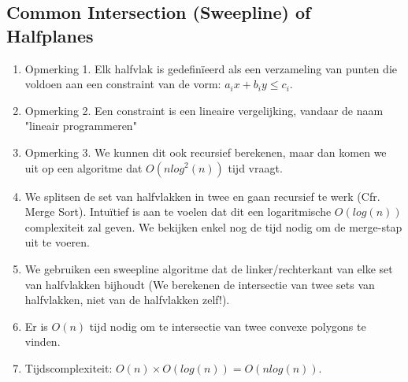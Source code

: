 \documentclass[12pt,a4paper]{article}
\begin{document}
		\subsection{Common Intersection (Sweepline) of Halfplanes}
			\begin{enumerate}
				\item Opmerking 1. Elk halfvlak is gedefinïeerd als een verzameling van punten die voldoen aan een constraint van de vorm: $a_ix + b_iy \leq c_i$.
				\item Opmerking 2. Een constraint is een lineaire vergelijking, vandaar de naam "lineair programmeren"
				\item Opmerking 3. We kunnen dit ook recursief berekenen, maar dan komen we uit op een algoritme dat $O(n log^2 (n))$ tijd vraagt.
				\item We splitsen de set van halfvlakken in twee en gaan recursief te werk (Cfr. Merge Sort). Intuïtief is aan te voelen dat dit een logaritmische $O(log (n))$ complexiteit zal geven. We bekijken enkel nog de tijd nodig om de merge-stap uit te voeren. 
				\item We gebruiken een sweepline algoritme dat de linker/rechterkant van elke set van halfvlakken bijhoudt (We berekenen de intersectie van twee sets van halfvlakken, niet van de halfvlakken zelf!).
				\item Er is $O(n)$ tijd nodig om te intersectie van twee convexe polygons te vinden.
				\item Tijdscomplexiteit: $O(n) \times O(log (n)) = O(n log (n))$.
			\end{enumerate}
	
\end{document}
